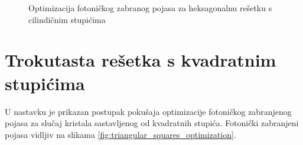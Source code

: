 \documentclass[utf8, seminar, numeric]{fer}
\begin{document}
\begin{figure}[ht]
\centering
    \qquad
	\caption{Optimizacija fotoničkog zabranog pojasa za heksagonalnu rešetku s
	cilindičnim stupićima}
	\label{fig:triangular_holes_optimization}
\end{figure}

\section{Trokutasta rešetka s kvadratnim stupićima}

U nastavku je prikazan postupak pokušaja optimizacije fotoničkog zabranjenog
pojasa za slučaj kristala sastavljenog od kvadratnih stupića. Fotonički
zabranjeni pojasa vidljiv na slikama \ref{fig:triangular_squares_optimization}.
\end{document}
